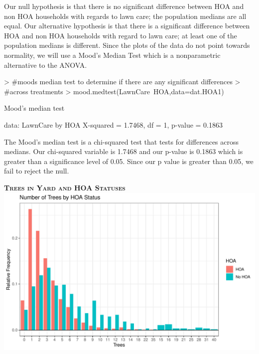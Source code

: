 \documentclass{article}
\begin{document}
Our null hypothesis is that there is no significant difference between HOA and non HOA households with regards to lawn care; the population medians are all equal. Our alternative hypothesis is that there is a significant difference between HOA and non HOA households with regard to lawn care; at least one of the population medians is different. Since the plots of the data do not point towards normality, we will use a Mood's Median Test which is a nonparametric alternative to the ANOVA.
\begin{Schunk}
\begin{Sinput}
> #moods median test to determine if there are any significant differences
> #across treatments
> mood.medtest(LawnCare~HOA,data=dat.HOA1)
\end{Sinput}
\begin{Soutput}
	Mood's median test

data:  LawnCare by HOA
X-squared = 1.7468, df = 1, p-value = 0.1863
\end{Soutput}
\end{Schunk}
The Mood's median test \citep{RVAideMemoire} is a chi-squared test that tests for differences across medians. Our chi-squared variable is 1.7468 and our p-value is 0.1863 which is greater than a significance level of 0.05. Since our p value is greater than 0.05, we fail to reject the null. 

\newpage
\textsc{\textbf{Trees in Yard and HOA Statuses}}
\newline
\newline
\includegraphics{part2-017}
\end{document}
